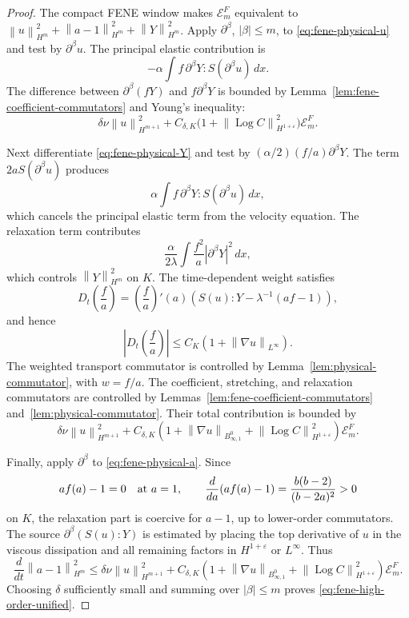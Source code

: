 \documentclass[11pt]{article}
\newcommand{\Log}{\operatorname{Log}}
\newcommand{\calE}{\mathcal E}
\newcommand{\eps}{\varepsilon}
\newcommand{\norm}[1]{\left\lVert #1\right\rVert}
\newcommand{\Besov}{B^0_{\infty,1}}
\begin{document}
\begin{proof}
The compact FENE window makes \(\calE_m^F\) equivalent to
\(\norm{u}_{H^m}^2+\norm{a-1}_{H^m}^2+\norm{Y}_{H^m}^2\).  Apply
\(\partial^\beta\), \(|\beta|\le m\), to \eqref{eq:fene-physical-u} and test
by \(\partial^\beta u\).  The principal elastic contribution is
\[
  -\alpha\int f\,\partial^\beta Y:S(\partial^\beta u)\,dx .
\]
The difference between \(\partial^\beta(fY)\) and \(f\partial^\beta Y\) is
bounded by Lemma~\ref{lem:fene-coefficient-commutators} and Young's inequality:
\[
  \delta\nu\norm{u}_{H^{m+1}}^2
  +C_{\delta,K}\bigl(1+\norm{\Log C}_{H^{1+\eps}}^2\bigr)\calE_m^F .
\]

Next differentiate \eqref{eq:fene-physical-Y} and test by
\((\alpha/2)(f/a)\partial^\beta Y\).  The term \(2aS(\partial^\beta u)\)
produces
\[
  \alpha\int f\,\partial^\beta Y:S(\partial^\beta u)\,dx ,
\]
which cancels the principal elastic term from the velocity equation.  The
relaxation term contributes
\[
  \frac{\alpha}{2\lambda}\int \frac{f^2}{a}|\partial^\beta Y|^2\,dx,
\]
which controls \(\norm{Y}_{H^m}^2\) on \(K\).  The time-dependent weight
satisfies
\[
  D_t\left(\frac fa\right)
  =
  \left(\frac fa\right)'(a)
  \left(S(u):Y-\lambda^{-1}(af-1)\right),
\]
and hence
\[
  \left|D_t\left(\frac fa\right)\right|
  \le C_K\left(1+\norm{\nabla u}_{L^\infty}\right).
\]
The weighted transport commutator is controlled by
Lemma~\ref{lem:physical-commutator}, with \(w=f/a\).  The coefficient,
stretching, and relaxation commutators are controlled by
Lemmas~\ref{lem:fene-coefficient-commutators} and~\ref{lem:physical-commutator}.
Their total contribution is bounded by
\[
  \delta\nu\norm{u}_{H^{m+1}}^2
  +C_{\delta,K}\left(1+\norm{\nabla u}_{\Besov}
  +\norm{\Log C}_{H^{1+\eps}}^2\right)\calE_m^F .
\]

Finally, apply \(\partial^\beta\) to \eqref{eq:fene-physical-a}.  Since
\[
  af(a)-1=0\quad\hbox{at }a=1,\qquad
  \frac{d}{da}(af(a)-1)=\frac{b(b-2)}{(b-2a)^2}>0
\]
on \(K\), the relaxation part is coercive for \(a-1\), up to lower-order
commutators.  The source \(\partial^\beta(S(u):Y)\) is estimated by placing the
top derivative of \(u\) in the viscous dissipation and all remaining factors in
\(H^{1+\eps}\) or \(L^\infty\).  Thus
\[
  \frac{d}{dt}\norm{a-1}_{H^m}^2
  \le
  \delta\nu\norm{u}_{H^{m+1}}^2
  +C_{\delta,K}\left(1+\norm{\nabla u}_{\Besov}
  +\norm{\Log C}_{H^{1+\eps}}^2\right)\calE_m^F .
\]
Choosing \(\delta\) sufficiently small and summing over \(|\beta|\le m\)
proves \eqref{eq:fene-high-order-unified}.
\end{proof}
\end{document}
